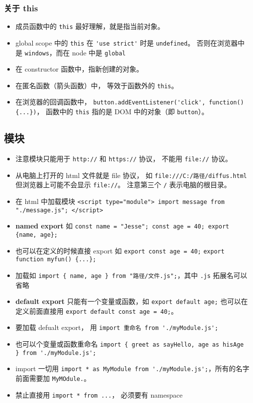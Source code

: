 \subsubsection{关于 this}
\begin{itemize}
\item 成员函数中的 \verb`this` 最好理解，就是指当前对象。
\item global scope 中的 \verb`this` 在 \verb`'use strict'` 时是 \verb`undefined`。 否则在浏览器中是 \verb`windows`，而在 node 中是 \verb`global`
\item 在 constructor 函数中，指新创建的对象。
\item 在匿名函数（箭头函数）中， 等效于函数外的 \verb`this`。
\item 在浏览器的回调函数中， \verb`button.addEventListener('click', function() {...})`， 函数中的 \verb`this` 指的是 DOM 中的对象（即 \verb`button`）。
\end{itemize}

\subsection{模块}
\begin{itemize}
\item 注意模块只能用于 \verb|http://| 和 \verb|https://| 协议， 不能用 \verb|file://| 协议。
\item 从电脑上打开的 html 文件就是 file 协议， 如 \verb|file:///C:/路径/diffus.html| 但浏览器上可能不会显示 \verb|file://|。 注意第三个 \verb|/| 表示电脑的根目录。
\item 在 html 中加载模块 \verb|<script type="module"> import message from "./message.js"; </script>|
\item \textbf{named export} 如 \verb|const name = "Jesse"; const age = 40; export {name, age};|
\item 也可以在定义的时候直接 export 如 \verb`export const age = 40;` \verb`export function myfun() {...};`
\item 加载如 \verb|import { name, age } from "路径/文件.js";|，其中 \verb`.js` 拓展名可以省略
\item \textbf{default export} 只能有一个变量或函数，如 \verb|export default age;| 也可以在定义前面直接用 \verb`export default const age = 40;`。
\item 要加载 defualt export， 用 \verb`import 重命名 from './myModule.js';`
\item 也可以个变量或函数重命名 \verb`import { greet as sayHello, age as hisAge } from './myModule.js';`
\item import 一切用 \verb`import * as MyModule from './myModule.js';`，所有的名字前面需要加 \verb`MyMOdule.`。
\item 禁止直接用 \verb`import * from ...`， 必须要有 namespace
\end{itemize}

